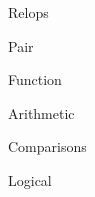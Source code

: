 \categorycontents{}
\newpage

\begin{algorithm}{Relops}
\end{algorithm}
\begin{algorithm}{Pair}
\end{algorithm}
\begin{algorithm}{Function}
\end{algorithm}
\begin{algorithm}{Arithmetic}
\end{algorithm}
\begin{algorithm}{Comparisons}
\end{algorithm}
\begin{algorithm}{Logical}
\end{algorithm}


